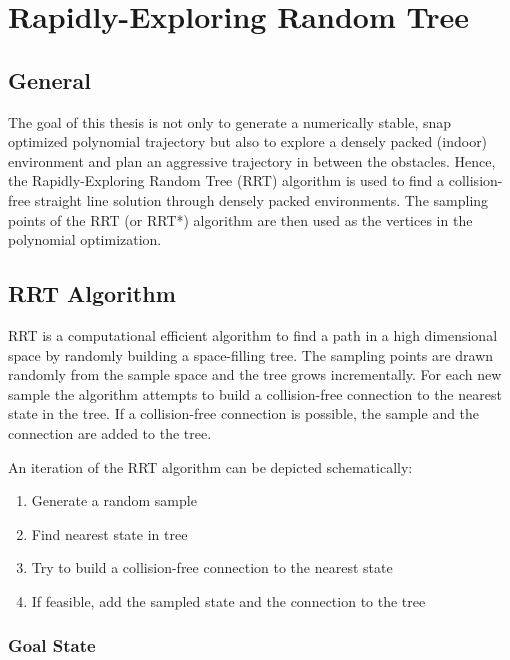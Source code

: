 \chapter{Rapidly-Exploring Random Tree}\label{chap:RRT}

\section{General}

The goal of this thesis is not only to generate a numerically stable, snap optimized polynomial trajectory but also to explore a densely packed (indoor) environment and plan an aggressive trajectory in between the obstacles. Hence, the Rapidly-Exploring Random Tree (RRT) algorithm is used to find a collision-free straight line solution through densely packed environments. The sampling points of the RRT (or RRT*) algorithm are then used as the vertices in the polynomial optimization.

\section{RRT Algorithm}\label{sec:RRT}

RRT is a computational efficient algorithm to find a path in a high dimensional space by randomly building a space-filling tree. The sampling points are drawn randomly from the sample space and the tree grows incrementally. 
For each new sample the algorithm attempts to build a collision-free connection to the nearest state in the tree. If a collision-free connection is possible, the sample and the connection are added to the tree. \newline

An iteration of the RRT algorithm can be depicted schematically:

\begin{enumerate}
  \item Generate a random sample
  \item Find nearest state in tree
  \item Try to build a collision-free connection to the nearest state
  \item If feasible, add the sampled state and the connection to the tree
\end{enumerate}

\subsection{Goal State}

